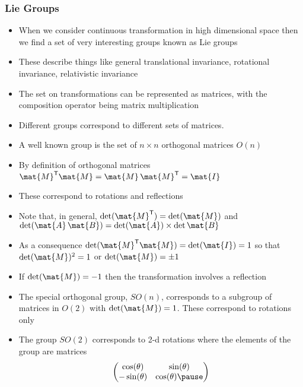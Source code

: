 \documentclass[11pt]{article}
\newcommand{\tr}{\textsf{T}}
\begin{document}
\subsubsection{Lie Groups}
\label{sec:org9614cdd}
\begin{itemize}
\item When we consider continuous transformation in high dimensional space then we find a
set of very interesting groups known as Lie groups
\item These describe things like general translational invariance, rotational invariance,
relativistic invariance
\item The set on transformations can be represented as matrices, with the composition operator
being matrix multiplication
\item Different groups correspond to different sets of matrices.
\item A well known group is the set of \(n\times n\) orthogonal matrices \(O(n)\)
\item By definition of orthogonal matrices \(\mat{M}^\tr \mat{M} = \mat{M}\, \mat{M}^\tr = \mat{I}\)
\item These correspond to rotations and reflections
\item Note that, in general,  \(\det(\mat{M}^{\tr}) = \det(\mat{M})\) and
\(\det(\mat{A}\,\mat{B}) = \det(\mat{A}) \times \det{\mat{B}}\)
\item As a consequence \(\det(\mat{M}^\tr \mat{M} ) = \det(\mat{I}) =1\) so
that \(\det(\mat{M})^{2}=1\) or \(\det(\mat{M}) = \pm 1\)
\item If \(\det(\mat{M}) = -1\) then the  transformation involves a reflection
\item The special orthogonal group, \(SO(n)\), corresponds to a subgroup
of matrices in \(O(2)\) with \(\det(\mat{M})=1\).  These correspond
to rotations only
\item The group \(SO(2)\) corresponds to 2-d rotations where the
elements of the group are matrices
 \begin{align*}
 \begin{pmatrix}
    \cos(\theta) & \sin(\theta) \\
   -\sin(\theta) & \cos(\theta)\pause
 \end{pmatrix}
\end{align*}
\end{itemize}
\end{document}
